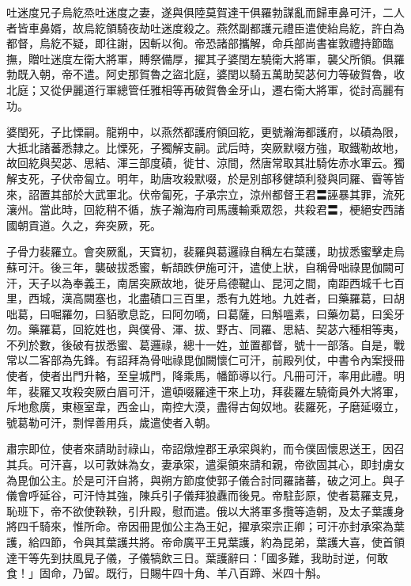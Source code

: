 \begin{pinyinscope}
 吐迷度兄子烏紇烝吐迷度之妻，遂與俱陸莫賀達干俱羅勃謀亂而歸車鼻可汗，二人者皆車鼻婿，故烏紇領騎夜劫吐迷度殺之。燕然副都護元禮臣遣使紿烏紇，許白為都督，烏紇不疑，即往謝，因斬以徇。帝恐諸部攜解，命兵部尚書崔敦禮持節臨撫，贈吐迷度左衛大將軍，賻祭備厚，擢其子婆閏左驍衛大將軍，襲父所領。俱羅勃既入朝，帝不遣。阿史那賀魯之盜北庭，婆閏以騎五萬助契苾何力等破賀魯，收北庭；又從伊麗道行軍總管任雅相等再破賀魯金牙山，遷右衛大將軍，從討高麗有功。



 婆閏死，子比慄嗣。龍朔中，以燕然都護府領回紇，更號瀚海都護府，以磧為限，大抵北諸蕃悉隸之。比慄死，子獨解支嗣。武后時，突厥默啜方強，取鐵勒故地，故回紇與契苾、思結、渾三部度磧，徙甘、涼間，然唐常取其壯騎佐赤水軍云。獨解支死，子伏帝匐立。明年，助唐攻殺默啜，於是別部移健頡利發與同羅、霫等皆來，詔置其部於大武軍北。伏帝匐死，子承宗立，涼州都督王君〓誣暴其罪，流死瀼州。當此時，回紇稍不循，族子瀚海府司馬護輸乘眾怨，共殺君〓，梗絕安西諸國朝貢道。久之，奔突厥，死。



 子骨力裴羅立。會突厥亂，天寶初，裴羅與葛邏祿自稱左右葉護，助拔悉蜜擊走烏蘇可汗。後三年，襲破拔悉蜜，斬頡跌伊施可汗，遣使上狀，自稱骨咄祿毘伽闕可汗，天子以為奉義王，南居突厥故地，徙牙烏德鞬山、昆河之間，南距西城千七百里，西城，漢高闕塞也，北盡磧口三百里，悉有九姓地。九姓者，曰藥羅葛，曰胡咄葛，曰啒羅勿，曰貊歌息訖，曰阿勿嘀，曰葛薩，曰斛嗢素，曰藥勿葛，曰奚牙勿。藥羅葛，回紇姓也，與僕骨、渾、拔、野古、同羅、思結、契苾六種相等夷，不列於數，後破有拔悉蜜、葛邏祿，總十一姓，並置都督，號十一部落。自是，戰常以二客部為先鋒。有詔拜為骨咄祿毘伽闕懷仁可汗，前殿列仗，中書令內案授冊使者，使者出門升輅，至皇城門，降乘馬，幡節導以行。凡冊可汗，率用此禮。明年，裴羅又攻殺突厥白眉可汗，遣頓啜羅達干來上功，拜裴羅左驍衛員外大將軍，斥地愈廣，東極室韋，西金山，南控大漠，盡得古匈奴地。裴羅死，子磨延啜立，號葛勒可汗，剽悍善用兵，歲遣使者入朝。



 肅宗即位，使者來請助討祿山，帝詔燉煌郡王承寀與約，而令僕固懷恩送王，因召其兵。可汗喜，以可敦妹為女，妻承寀，遣渠領來請和親，帝欲固其心，即封虜女為毘伽公主。於是可汗自將，與朔方節度使郭子儀合討同羅諸蕃，破之河上。與子儀會呼延谷，可汗恃其強，陳兵引子儀拜狼纛而後見。帝駐彭原，使者葛羅支見，恥班下，帝不欲使鞅鞅，引升殿，慰而遣。俄以大將軍多攬等造朝，及太子葉護身將四千騎來，惟所命。帝因冊毘伽公主為王妃，擢承寀宗正卿；可汗亦封承寀為葉護，給四節，令與其葉護共將。帝命廣平王見葉護，約為昆弟，葉護大喜，使首領達干等先到扶風見子儀，子儀犒飲三日。葉護辭曰：「國多難，我助討逆，何敢食！」固命，乃留。既行，日賜牛四十角、羊八百蹄、米四十斛。




\end{pinyinscope}
